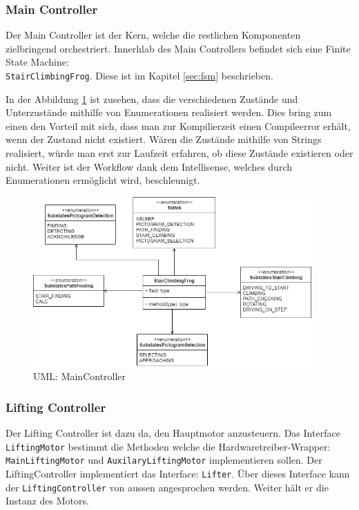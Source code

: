 \subsubsection{Main Controller}
Der Main Controller ist der Kern, welche die restlichen Komponenten zielbringend orchestriert. Innerhlab des Main Controllers befindet sich eine Finite State Machine:\\ \texttt{StairClimbingFrog}. Diese ist im Kapitel \ref{sec:fsm} beschrieben. 

In der Abbildung \ref{fig:uml-main} ist zusehen, dass die verschiedenen Zustände und Unterzustände mithilfe von Enumerationen realisiert werden. Dies bring zum einen den Vorteil mit sich, dass man zur Kompilierzeit einen Compileerror erhält, wenn der Zustand nicht existiert. Wären die Zustände mithilfe von Strings realisiert, würde man erst zur Laufzeit erfahren, ob diese Zustände existieren oder nicht. Weiter ist der Workflow dank dem Intellisense, welches durch Enumerationen ermöglicht wird, beschleunigt.

\begin{figure}[H]
  \includegraphics[width=0.95\textwidth]{img/softwarearchitektur/UML-MainController.png}
  \centering
  \caption{UML: MainController}
  \label{fig:uml-main}
\end{figure}


\subsubsection{Lifting Controller}
Der Lifting Controller ist dazu da, den Hauptmotor anzusteuern.
Das Interface \texttt{LiftingMotor} bestimmt die Methoden welche die Hardwaretreiber-Wrapper: \texttt{MainLiftingMotor} und \texttt{AuxilaryLiftingMotor} implementieren sollen. Der LiftingController implementiert das Interface: \texttt{Lifter}. Über dieses Interface kann der \texttt{LiftingController} von aussen angesprochen werden. Weiter hält er die Instanz des Motors.

